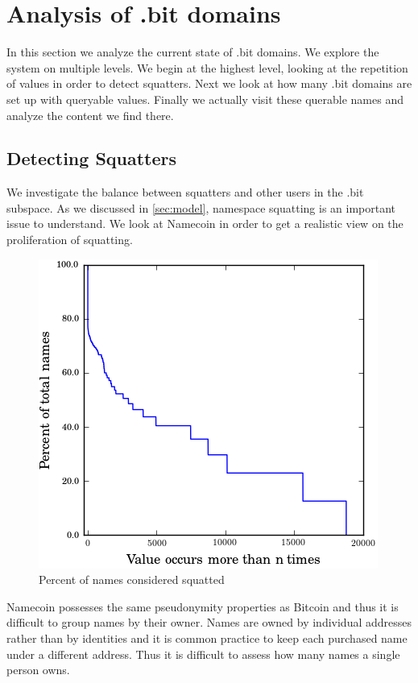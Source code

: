 \section{Analysis of .bit domains}

In this section we analyze the current state of .bit domains. We explore the system on multiple levels. We begin at the highest level, looking at the repetition of values in order to detect squatters. Next we look at how many .bit domains are set up with queryable values. Finally we actually visit these querable names and analyze the content we find there.

\subsection{Detecting Squatters}

We investigate the balance between squatters and other users in the .bit subspace. As we discussed in \ref{sec:model}, namespace squatting is an important issue to understand. We look at Namecoin in order to get a realistic view on the proliferation of squatting.

\begin{figure}
  \centering
  \includegraphics[width=0.9\columnwidth]{figures/squatters}
  \caption{Percent of names considered squatted}
  \label{fig:percentSquatter}
\end{figure}

Namecoin possesses the same pseudonymity properties as Bitcoin and thus it is difficult to group names by their owner. Names are owned by individual addresses rather than by identities and it is common practice to keep each purchased name under a different address. Thus it is difficult to assess how many names a single person owns. 

